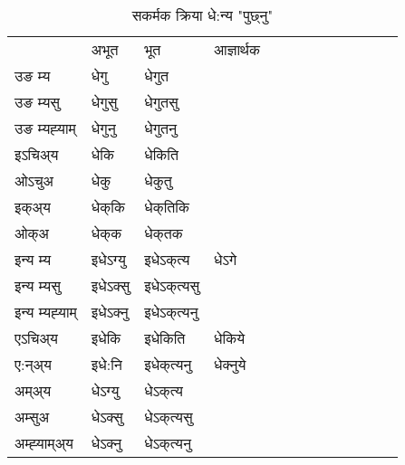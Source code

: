 \begin{table}[H]
\centering
\caption{\label{ek.vt} सकर्मक क्रिया  धे:न्य  "पुछ्नु"  }
\begin{tabular}{l|l|l|l|l|l|l|l|l|l|l|l|l}  \toprule
&अभूत & भूत & आज्ञार्थक \\ 
उङ म्य &धेगु &धेगुत \\ 
उङ म्यसु &धेगुसु &धेगुतसु \\ 
उङ म्यह्‍याम् &धेगुनु &धेगुतनु \\ 
इऽचिअ्य  &धेकि &धेकिति   \\ 
ओऽचुअ &धेकु &धेकुतु   \\ 
इक्अ्य &धेक्‌कि &धेक्‌तिकि   \\ 
ओक्अ &धेक्‌क &धेक्‌तक   \\ 
इन्य म्य& इधेऽग्यु  & इधेऽक्‌त्य &धेऽगे  \\ 
इन्य म्यसु & इधेऽक्सु  & इधेऽक्‌त्यसु   \\ 
इन्य म्यह्‍याम् & इधेऽक्‍नु  & इधेऽक्‌त्यनु   \\ 
एऽचिअ्य & इधेकि & इधेकिति &धेकिये    \\ 
ए:न्अ्य & इधे:नि  & इधेक्‌त्यनु &धेक्‍नुये  \\ 
अम्अ्य & धेऽग्यु  & धेऽक्‌त्य  \\ 
अम्सुअ & धेऽक्सु & धेऽक्‌त्यसु  \\ 
अम्ह्‍याम्अ्य & धेऽक्‍नु  & धेऽक्‌त्यनु \\ 
\bottomrule
\end{tabular}
\end{table}


